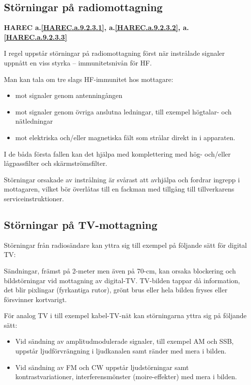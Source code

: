 \subsection{Störningar på radiomottagning}
\textbf{
HAREC a.\ref{HAREC.a.9.2.3.1}\label{myHAREC.a.9.2.3.1},
 a.\ref{HAREC.a.9.2.3.2}\label{myHAREC.a.9.2.3.2},
 a.\ref{HAREC.a.9.2.3.3}\label{myHAREC.a.9.2.3.3}
}

I regel uppstår störningar på radiomottagning först när instrålade signaler
uppnått en viss styrka -- immunitetsnivån för HF.

Man kan tala om tre slags HF-immunitet hos mottagare:
\begin{itemize}
\item mot signaler genom antenningången
\item mot signaler genom övriga anslutna ledningar, till exempel högtalar-
  och nätledningar
\item mot elektriska och/eller magnetiska fält som strålar direkt in i
  apparaten.
\end{itemize}

I de båda första fallen kan det hjälpa med komplettering med hög- och/eller
lågpassfilter och skärmströmsfilter.

Störningar orsakade av instrålning är svårast att avhjälpa och fordrar ingrepp i
mottagaren, vilket bör överlåtas till en fackman med tillgång till
tillverkarens serviceinstruktioner.

\subsection{Störningar på TV-mottagning}

Störningar från radiosändare kan yttra sig till exempel på följande sätt för
digital TV:

Sändningar, främst på 2-meter men även på 70-cm, kan orsaka blockering och
bildstörningar vid mottagning av digital-TV.
TV-bilden tappar då information, det blir pixlingar (fyrkantiga rutor), grönt
brus eller hela bilden fryses eller försvinner kortvarigt.

För analog TV i till exempel kabel-TV-nät kan störningarna yttra sig på
följande sätt:
\begin{itemize}
\item Vid sändning av amplitudmodulerade signaler, till exempel AM och SSB,
  uppstår ljudförvrängning i ljudkanalen samt ränder med mera i bilden.
\item Vid sändning av FM och CW uppstår ljudstörningar samt
  kontrastvariationer, interferensmönster (moire-effekter) med mera i bilden.
\end{itemize}

